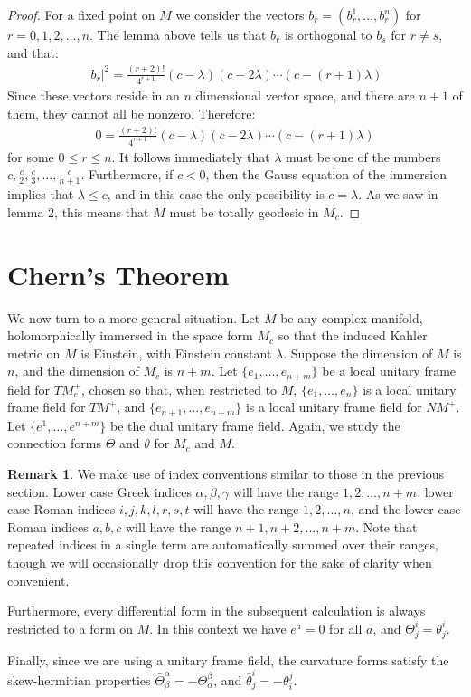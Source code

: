 \documentclass[11pt]{amsart}
\theoremstyle{definition}
\newtheorem{remark}[subsection]{Remark}
\def \TMp{ TM^{+} }
\def \NMp{ NM^+ }
\begin{document}
\begin{proof} For a fixed point on $M$ we consider the vectors $b_r = ( b^1_r, \ldots, b^n_r )$ for $r = 0,1,2, \ldots, n$.  The lemma above tells us that $b_r$ is orthogonal to $b_s$ for $r \neq s$, and that:
%
\begin{align*}
| b_r |^2 = \frac{(r + 2)!}{4^{r + 1}} (c - \lambda)(c - 2 \lambda) \cdots (c - (r+1) \lambda)
\end{align*}
%
Since these vectors reside in an $n$ dimensional vector space, and there are $n+1$ of them, they cannot all be nonzero.  Therefore:
%
\begin{align*}
0 = \frac{(r + 2)!}{4^{r + 1}} (c - \lambda)(c - 2 \lambda) \cdots (c - (r+1) \lambda)
\end{align*}
%
for some $0 \leq r \leq n$.  It follows immediately that $\lambda$ must be one of the numbers $c, \frac{c}{2}, \frac{c}{3}, \ldots, \frac{c}{n + 1}$.  Furthermore, if $c < 0$, then the Gauss equation of the immersion implies that $\lambda \leq c$, and in this case the only possibility is $c = \lambda$.  As we saw in lemma 2, this means that $M$ must be totally geodesic in $M_c$.
\end{proof}

\section{Chern's Theorem}

We now turn to a more general situation.  Let $M$ be any complex manifold, holomorphically immersed in the space form $M_c$ so that the induced Kahler metric on $M$ is Einstein, with Einstein constant $\lambda$.  Suppose the dimension of $M$ is $n$, and the dimension of $M_c$ is $n+m$.  Let $\{ e_1, \ldots, e_{n+m} \}$ be a local unitary frame field for $TM_c^{+}$, chosen so that, when restricted to $M$, $\{ e_1, \ldots, e_n \}$ is a local unitary frame field for $\TMp$, and $\{ e_{n+1}, \ldots, e_{n+m} \}$ is a local unitary frame field for $\NMp$.  Let $\{ e^1, \ldots, e^{n+m} \}$ be the dual unitary frame field.  Again, we study the connection forms $\Theta$ and $\theta$ for $M_c$ and $M$.

\begin{remark}  We make use of index conventions similar to those in the previous section.  Lower case Greek indices $\alpha, \beta, \gamma$ will have the range $1,2, \ldots, n+m$, lower case Roman indices $i,j,k,l,r,s,t$ will have the range $1,2, \ldots, n$, and the lower case Roman indices $a,b,c$ will have the range $n+1, n+2, \ldots, n+m$.  Note that repeated indices in a single term are automatically summed over their ranges, though we will occasionally drop this convention for the sake of clarity when convenient.

Furthermore, every differential form in the subsequent calculation is always restricted to a form on $M$. In this context we have $e^a = 0$ for all $a$, and $\Theta^i_j = \theta^i_j$.

Finally, since we are using a unitary frame field, the curvature forms satisfy the skew-hermitian properties $\bar{\Theta}^{\alpha}_{\beta} = - \Theta^{\beta}_{\alpha}$, and $\bar{\theta}^i_j = - \theta^j_i$.
\end{remark}
\end{document}
